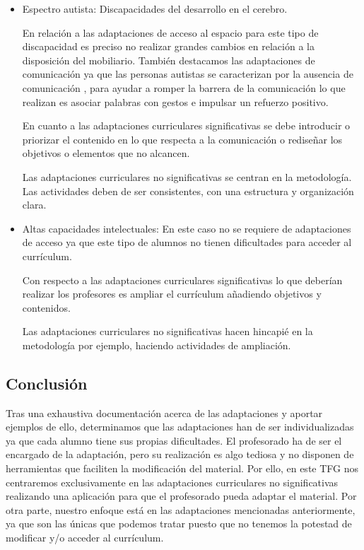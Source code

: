 \begin{itemize}
    \item Espectro autista: Discapacidades del desarrollo en el cerebro. 
    
    En relación a las adaptaciones de acceso al espacio para este tipo de discapacidad es preciso no realizar grandes cambios en relación a la disposición del mobiliario. También destacamos las adaptaciones de comunicación ya que las personas autistas se caracterizan por la ausencia de comunicación , para ayudar a romper la barrera de la comunicación lo que realizan es asociar palabras con gestos e impulsar un refuerzo positivo.

    En cuanto a las adaptaciones curriculares significativas se debe introducir o priorizar el contenido en lo que respecta a la  comunicación o rediseñar los objetivos o elementos que no alcancen.

   Las adaptaciones curriculares no significativas se centran en la metodología. Las actividades deben de ser consistentes, con una estructura y organización clara.

    \item Altas capacidades intelectuales: En este caso no se requiere de adaptaciones de acceso ya que  este tipo de alumnos no tienen dificultades para acceder al currículum. 
    
    Con respecto a las adaptaciones curriculares significativas lo que deberían realizar los profesores es ampliar el currículum añadiendo objetivos y contenidos.

   Las adaptaciones curriculares no significativas hacen hincapié en la metodología por ejemplo, haciendo actividades de ampliación.

\end{itemize}

\subsection{Conclusión}
Tras una exhaustiva documentación acerca de las adaptaciones y aportar ejemplos de ello, determinamos que las adaptaciones han de ser individualizadas ya que cada alumno tiene sus propias dificultades. El profesorado ha de ser el encargado de la adaptación, pero su realización es algo tediosa y no disponen de herramientas que faciliten la modificación del material. Por ello, en este TFG nos centraremos exclusivamente en las adaptaciones curriculares no significativas realizando una aplicación para que el profesorado pueda adaptar el material. Por otra parte, nuestro enfoque está en las adaptaciones mencionadas anteriormente, ya que son las únicas que podemos tratar puesto que no tenemos la potestad de modificar y/o acceder al currículum. 

